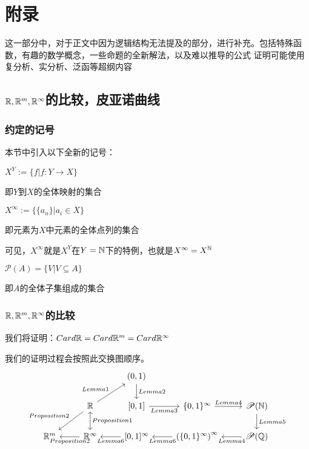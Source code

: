 \documentclass[12pt, a4paper, oneside, UTF8]{ctexbook}
\begin{document}
	\else
	\fi
	\chapter{附录}
	这一部分中，对于正文中因为逻辑结构无法提及的部分，进行补充。包括特殊函数，有趣的数学概念，一些命题的全新解法，以及难以推导的公式
	证明可能使用复分析、实分析、泛函等超纲内容
	
	\section{\texorpdfstring{$\mathbb{R},\mathbb{R}^m,\mathbb{R}^\infty$}势的比较，皮亚诺曲线}
		\subsection{约定的记号}
			本节中引入以下全新的记号：
			\begin{para}{0}
					\begin{defn}{}{}
						$X^Y := \{f| f:Y \rightarrow X\}$
						
						即$Y$到$X$的全体映射的集合
					\end{defn}
					\begin{defn}{}{}
						$X^\infty := \{\{a_n\}| a_i\in X\}$
						
						即元素为$X$中元素的全体点列的集合
					\end{defn}
					可见，$X^\infty$就是$X^Y$在$Y=\mathbb{N}$下的特例，也就是$X^{\infty}=X^{\mathbb{N}}$
					\begin{defn}{}{}
						$\mathscr{P}(A) = \{V|V \subseteq A\}$
						
						即$A$的全体子集组成的集合
					\end{defn}
			\end{para}
			
		\subsection{\texorpdfstring{$\mathbb{R},\mathbb{R}^m,\mathbb{R}^\infty$}势的比较}
			我们将证明：$Card \mathbb{R} = Card \mathbb{R}^m = Card \mathbb{R}^\infty$
			
			我们的证明过程会按照此交换图顺序。
			\[\begin{tikzcd}
				&& {(0,1)} \\
				& {\mathbb{R}} & {[0,1]} & {\{0,1\}^{\infty}} & {\mathscr{P}(\mathbb{N})} \\
				{\mathbb{R}^m} & {\mathbb{R}^\infty} & {[0,1]^\infty} & {\left(\{0,1\}^{\infty}\right)^\infty} & {\mathscr{P}(\mathbb{Q})}
				\arrow["{Lemma2}", from=1-3, to=2-3]
				\arrow["{Lemma1}", from=2-2, to=1-3]
				\arrow["{Proposition2}"', from=2-2, to=3-1]
				\arrow["{Proposition1}", leftrightarrow, from=2-2, to=3-2]
				\arrow["{Lemma3}"', from=2-3, to=2-4]
				\arrow["{Lemma4}", from=2-4, to=2-5]
				\arrow["{Lemma5}", from=2-5, to=3-5]
				\arrow["{Proposition2}", from=3-2, to=3-1]
				\arrow["{Lemma6}", from=3-3, to=3-2]
				\arrow["{Lemma6}", from=3-4, to=3-3]
				\arrow["{Lemma4}", from=3-5, to=3-4]
			\end{tikzcd}\]
			
\end{document}
